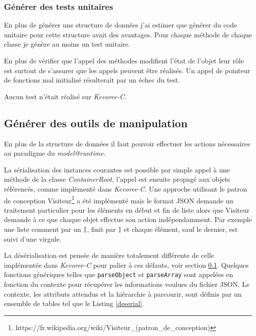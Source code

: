 \subsubsection{Générer des tests unitaires}

En plus de générer une structure de données j'ai estimer que générer du code unitaire pour cette structure avait des avantages. Pour chaque méthode de chaque classe je génère au moins un test unitaire.

En plus de vérifier que l'appel des méthodes modifient l'état de l'objet leur rôle est surtout de s'assurer que les appels peuvent être réalisés. Un appel de pointeur de fonctions mal initialisé résulterait par un échec du test.

Aucun test n'était réalisé sur \emph{Kevoree-C}.

\subsection{Générer des outils de manipulation}

En plus de la structure de données il faut pouvoir effectuer les actions nécessaires au paradigme du \emph{model@runtime}.

La sérialisation des instances courantes est possible par simple appel à une méthode de la classe \emph{ContainerRoot}, l'appel est ensuite propagé aux objets référencés, comme implémenté dans \emph{Kevoree-C}. Une approche utilisant le patron de conception Visiteur\footnote{https://fr.wikipedia.org/wiki/Visiteur\_(patron\_de\_conception)} a été implémenté mais le format JSON demande un traitement particulier pour les éléments en début et fin de liste alors que Visiteur demande à ce que chaque objet effectue son action indépendamment. Par exemple une liste comment par un \texttt{[}, finit par \texttt{]} et chaque élément, sauf le dernier, est suivi d'une virgule.

La désérialisation est pensée de manière totalement différente de celle implémentée dans \emph{Kevoree-C} pour palier à ces défauts, voir section \ref{}. Quelques fonctions génériques telles que \texttt{parseObject} et \texttt{parseArray} sont appelées en fonction du contexte pour récupérer les informations voulues du fichier JSON. Le contexte, les attributs attendus et la hiérarchie à parcourir, sont définis par un ensemble de tables tel que le Listing \ref{deserial}.


